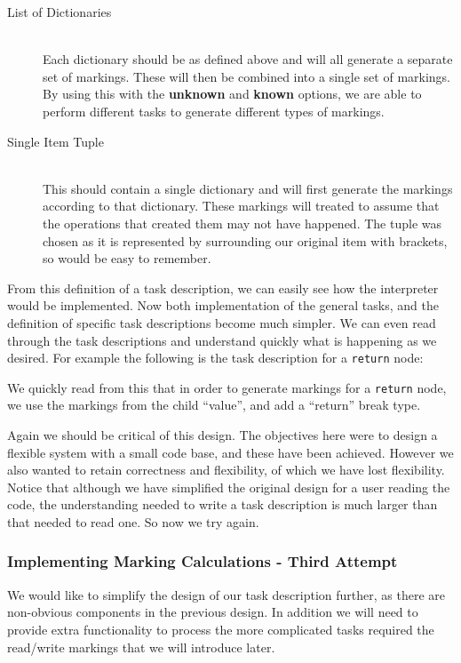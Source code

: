 \documentclass[twoside,a4paper]{report}
\begin{document}
\begin{description}
\item[List of Dictionaries] \hfill \\
Each dictionary should be as defined above and will all generate a separate set of markings. These will then be combined into a single set of markings.
By using this with the \textbf{unknown} and \textbf{known} options, we are able to perform different tasks to generate different types of markings.

\item[Single Item Tuple] \hfill \\
This should contain a single dictionary and will first generate the markings according to that dictionary. These markings will treated to assume that
the operations that created them may not have happened. The tuple was chosen as it is represented by surrounding our original item with brackets, so
would be easy to remember.
\end{description}

From this definition of a task description, we can easily see how the interpreter would be implemented. Now both implementation of the general tasks, and
the definition of specific task descriptions become much simpler. We can even read through the task descriptions and understand quickly what is happening
as we desired. For example the following is the task description for a \texttt{return} node:



We quickly read from this that in order to generate markings for a \texttt{return} node, we use the markings from the child ``value'', and add a ``return'' break type.

Again we should be critical of this design. The objectives here were to design a flexible system with a small code base, and these have been achieved.
However we also wanted to retain correctness and flexibility, of which we have lost flexibility. Notice that although we have simplified the
original design for a user reading the code, the understanding needed to write a task description is much larger than that needed to read one. So now we try again.

\subsubsection{Implementing Marking Calculations - Third Attempt}

We would like to simplify the design of our task description further, as there are non-obvious components in the previous design. In addition we will
need to provide extra functionality to process the more complicated tasks required the read/write markings that we will introduce later.
\end{document}
